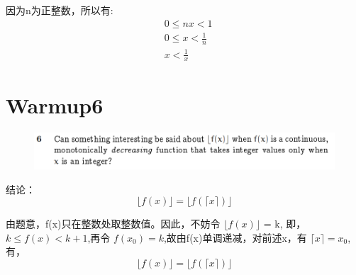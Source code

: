 \documentclass[]{article}
\begin{document}
因为n为正整数，所以有:
\begin{align}
    &0 \le n{x} < 1\\
    &0 \le {x} < \frac{1}{n}\\
    & {x} < \frac{1}{x}
\end{align}

\section*{Warmup6}
\begin{figure}[H]
\includegraphics[scale = 1]{Q6.png}
\end{figure}
结论：
\begin{equation}
    \lfloor f(x) \rfloor = \lfloor f(\lceil x \rceil) \rfloor
\end{equation}

由题意，f(x)只在整数处取整数值。因此，不妨令 $\lfloor f(x) \rfloor$ = k,
即，$k \le f(x) < k+1 $,再令 $f(x_{0}) = k$,故由f(x)单调递减，对前述x，有 $\lceil x \rceil = x_{0}$,
有，
\begin{equation}
    \lfloor f(x) \rfloor = \lfloor f(\lceil x \rceil) \rfloor
\end{equation}
\end{document}
